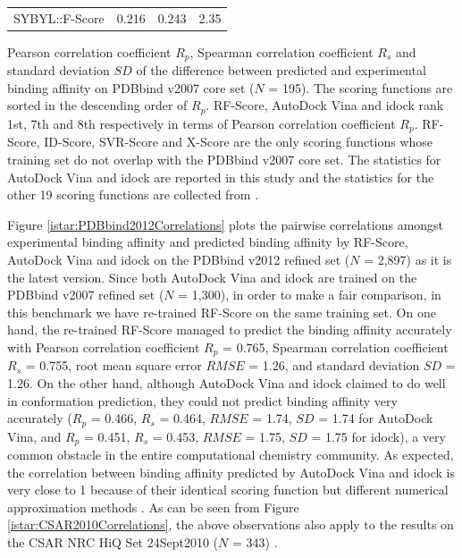 \begin{table}
\begin{tabular}{lrrr}
SYBYL::F-Score & 0.216 & 0.243 & 2.35\\
\end{tabular}
\begin{flushleft}
\label{istar:ScoringFunctionComparison} Pearson correlation coefficient $R_p$, Spearman correlation coefficient $R_s$ and standard deviation $SD$ of the difference between predicted and experimental binding affinity on PDBbind v2007 core set ($N$ = 195). The scoring functions are sorted in the descending order of $R_p$. RF-Score, AutoDock Vina and idock rank 1st, 7th and 8th respectively in terms of Pearson correlation coefficient $R_p$. RF-Score, ID-Score, SVR-Score and X-Score are the only scoring functions whose training set do not overlap with the PDBbind v2007 core set. The statistics for AutoDock Vina and idock are reported in this study and the statistics for the other 19 scoring functions are collected from \citep{1313,564,1305,1295}.
\end{flushleft}
\end{table}

Figure \ref{istar:PDBbind2012Correlations} plots the pairwise correlations amongst experimental binding affinity and predicted binding affinity by RF-Score, AutoDock Vina and idock on the PDBbind v2012 \citep{529,530} refined set ($N$ = 2,897) as it is the latest version. Since both AutoDock Vina and idock are trained on the PDBbind v2007 refined set ($N$ = 1,300), in order to make a fair comparison, in this benchmark we have re-trained RF-Score on the same training set. On one hand, the re-trained RF-Score managed to predict the binding affinity accurately with Pearson correlation coefficient $R_p$ = 0.765, Spearman correlation coefficient $R_s$ = 0.755, root mean square error $RMSE$ = 1.26, and standard deviation $SD$ = 1.26. On the other hand, although AutoDock Vina and idock claimed to do well in conformation prediction, they could not predict binding affinity very accurately ($R_p$ = 0.466, $R_s$ = 0.464, $RMSE$ = 1.74, $SD$ = 1.74 for AutoDock Vina, and $R_p$ = 0.451, $R_s$ = 0.453, $RMSE$ = 1.75, $SD$ = 1.75 for idock), a very common obstacle in the entire computational chemistry community. As expected, the correlation between binding affinity predicted by AutoDock Vina and idock is very close to 1 because of their identical scoring function but different numerical approximation methods \citep{1153}. As can be seen from Figure \ref{istar:CSAR2010Correlations}, the above observations also apply to the results on the CSAR NRC HiQ Set 24Sept2010 ($N$ = 343) \citep{857,960}.

